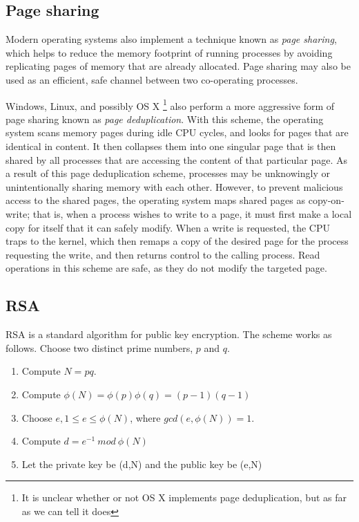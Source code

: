 \documentclass[11pt]{llncs}
\begin{document}
\subsection{Page sharing} %

Modern operating systems also implement a technique known as \textit{page
sharing}, which helps to reduce the memory footprint of running processes by
avoiding replicating pages of memory that are already allocated. Page sharing
may also be used as an efficient, safe channel between two co-operating
processes.

Windows, Linux, and possibly OS X \footnote{It is unclear whether or not OS X
implements page deduplication, but as far as we can tell it does} also perform a
more aggressive form of page sharing known as \textit{page deduplication}. With
this scheme, the operating system scans memory pages during idle CPU cycles, and
looks for pages that are identical in content. It then collapses them into one
singular page that is then shared by all processes that are accessing the
content of that particular page. As a result of this page deduplication scheme,
processes may be unknowingly or unintentionally sharing memory with each other.
However, to prevent malicious access to the shared pages, the operating system
maps shared pages as copy-on-write; that is, when a process wishes to write to a
page, it must first make a local copy for itself that it can safely modify. When
a write is requested, the CPU traps to the kernel, which then remaps a copy of
the desired page for the process requesting the write, and then returns control
to the calling process. Read operations in this scheme are safe, as they do not
modify the targeted page.

\subsection{RSA}

RSA is a standard algorithm for public key encryption. The scheme works as
follows. Choose two distinct prime numbers, $p$ and $q$.

\begin{enumerate}
    \item Compute $N = pq$.
    \item Compute $\phi(N) = \phi(p)\phi(q) = (p-1)(q-1)$
    \item Choose $e, 1 \leq e \leq \phi(N)$, where $gcd(e,\phi(N)) = 1$.
    \item Compute $d = e^{-1}\ mod\ \phi(N)$
    \item Let the private key be (d,N) and the public key be (e,N)
\end{enumerate} 
\end{document}
